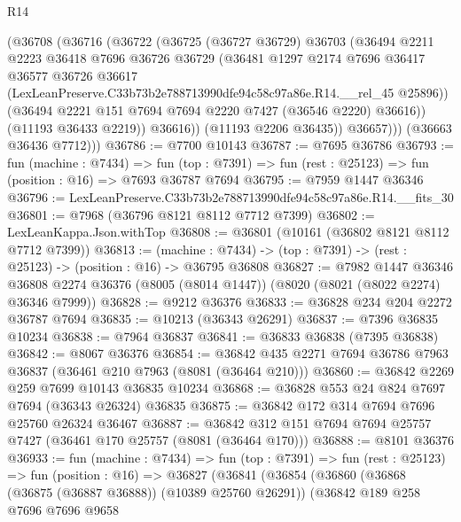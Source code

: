 \begin{lexlean}{R14}
\begin{coremodule}
              (@36708
                (@36716
                  (@36722
                    (@36725
                      (@36727 @36729)
                      @36703
                      (@36494
                        @2211
                        @2223
                        @36418
                        @7696
                        @36726
                        @36729
                        (@36481
                          @1297
                          @2174
                          @7696
                          @36417
                          @36577
                          @36726
                          @36617
                          (LexLeanPreserve.C33b73b2e788713990dfe94c58c97a86e.R14.__rel_45 @25896))
                        (@36494 @2221 @151 @7694 @7694 @2220 @7427 (@36546 @2220) @36616))
                      (@11193 @36433 @2219))
                    @36616))
                (@11193 @2206 @36435))
              @36657)))
        (@36663 @36436 @7712)))
@36786 := @7700 @10143
@36787 := @7695 @36786
@36793 := fun (machine : @7434) =>
  fun (top : @7391) => fun (rest : @25123) => fun (position : @16) => @7693 @36787 @7694
@36795 := @7959 @1447 @36346
@36796 := LexLeanPreserve.C33b73b2e788713990dfe94c58c97a86e.R14.__fits_30
@36801 := @7968 (@36796 @8121 @8112 @7712 @7399)
@36802 := LexLeanKappa.Json.withTop
@36808 := @36801 (@10161 (@36802 @8121 @8112 @7712 @7399))
@36813 := (machine : @7434) -> (top : @7391) -> (rest : @25123) -> (position : @16) -> @36795 @36808
@36827 := @7982
    @1447
    @36346
    @36808
    @2274
    @36376
    (@8005 (@8014 @1447))
    (@8020 (@8021 (@8022 @2274) @36346 @7999))
@36828 := @9212 @36376
@36833 := @36828 @234 @204 @2272 @36787 @7694
@36835 := @10213 (@36343 @26291)
@36837 := @7396 @36835 @10234
@36838 := @7964 @36837
@36841 := @36833 @36838 (@7395 @36838)
@36842 := @8067 @36376
@36854 := @36842 @435 @2271 @7694 @36786 @7963 @36837 (@36461 @210 @7963 (@8081 (@36464 @210)))
@36860 := @36842 @2269 @259 @7699 @10143 @36835 @10234
@36868 := @36828 @553 @24 @824 @7697 @7694 (@36343 @26324) @36835
@36875 := @36842 @172 @314 @7694 @7696 @25760 @26324 @36467
@36887 := @36842 @312 @151 @7694 @7694 @25757 @7427 (@36461 @170 @25757 (@8081 (@36464 @170)))
@36888 := @8101 @36376
@36933 := fun (machine : @7434) =>
  fun (top : @7391) =>
  fun (rest : @25123) =>
  fun (position : @16) =>
  @36827
    (@36841
      (@36854
        (@36860
          (@36868 (@36875 (@36887 @36888)) (@10389 @25760 @26291))
          (@36842
            @189
            @258
            @7696
            @7696
            @9658

\end{coremodule}
\end{lexlean}
